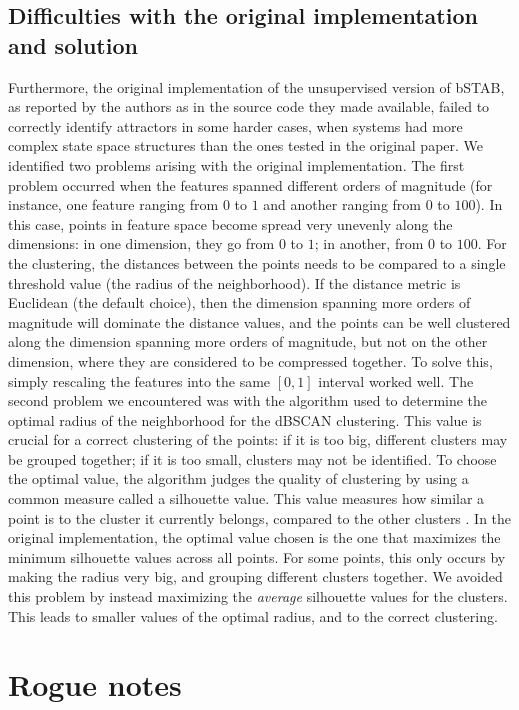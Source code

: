 \documentclass{article}
\begin{document}
\subsection{Difficulties with the original implementation and solution}
Furthermore, the original implementation of the unsupervised version of bSTAB, as reported by the authors as in the source code they made available, failed to correctly identify attractors in some harder cases, when systems had more complex state space structures than the ones tested in the original paper.
We identified two problems arising with the original implementation.
The first problem occurred when the features spanned different orders of magnitude (for instance, one feature ranging from $0$ to $1$ and another ranging from $0$ to $100$). In this case, points in feature space become spread very unevenly along the dimensions: in one dimension, they go from $0$ to $1$; in another, from $0$ to $100$. For the clustering, the distances between the points needs to be compared to a single threshold value (the radius of the neighborhood). If the distance metric is Euclidean (the default choice), then the dimension spanning more orders of magnitude will dominate the distance values, and the points can be well clustered along the dimension spanning more orders of magnitude, but not on the other dimension, where they are considered to be compressed together.  To solve this, simply rescaling the features into the same $[0,1]$ interval worked well.
The second problem we encountered was with the algorithm used to determine the optimal radius of the neighborhood for the dBSCAN clustering. This value is crucial for a correct clustering of the points: if it is too big, different clusters may be grouped together; if it is too small, clusters may not be identified. To choose the optimal value, the algorithm judges the quality of clustering by using a common measure called a silhouette value. This value measures how similar a point is to the cluster it currently belongs, compared to the other clusters \cite{}. In the original implementation, the optimal value chosen is the one that maximizes the minimum silhouette values across all points. For some points, this only occurs by making the radius very big, and grouping different clusters together. We avoided this problem by instead maximizing the \textit{average} silhouette values for the clusters. This leads to smaller values of the optimal radius, and to the correct clustering.


\section{Rogue notes}
\end{document}
